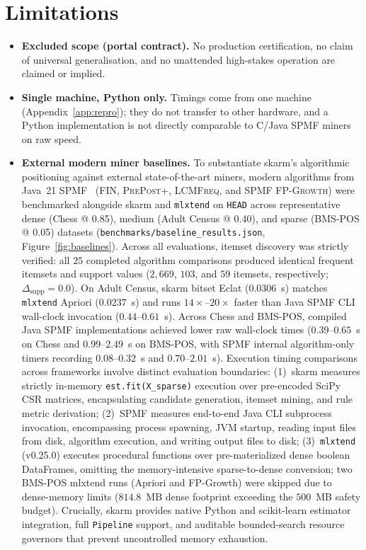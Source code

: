 \documentclass[twocolumn,10pt]{article}
\newcommand{\skarm}{\textsf{skarm}\xspace}
\begin{document}
\section{Limitations}
\label{sec:limitations}
\begin{itemize}
  \item \textbf{Excluded scope (portal contract).} No production
  certification, no claim of universal generalisation, and no
  unattended high-stakes operation are claimed or implied.
  \item \textbf{Single machine, Python only.} Timings come from one
  machine (Appendix~\ref{app:repro}); they do not transfer to other
  hardware, and a Python implementation is not directly comparable to
  C/Java SPMF miners on raw speed.
  \item \textbf{External modern miner baselines.} To substantiate \skarm's
  algorithmic positioning against external state-of-the-art miners, modern algorithms
  from Java~21 SPMF~\cite{fournier2022,kallay2025}
  (\textsc{FIN}, \textsc{PrePost+}, \textsc{LCMFreq}, and SPMF \textsc{FP-Growth})
  were benchmarked alongside \skarm and \texttt{mlxtend} on \texttt{HEAD} across representative
  dense (Chess @ 0.85), medium (Adult Census @ 0.40), and sparse (BMS-POS @ 0.05)
  datasets (\texttt{benchmarks/baseline\_results.json}, Figure~\ref{fig:baselines}).
  Across all evaluations, itemset discovery was strictly verified: all $25$ completed algorithm
  comparisons produced identical frequent itemsets and support values ($2{,}669$, $103$, and $59$ itemsets, respectively; $\Delta_{\mathrm{supp}} = 0.0$).
  On Adult Census, \skarm bitset Eclat ($0.0306$~s) matches \texttt{mlxtend} Apriori ($0.0237$~s) and runs $14\times$--$20\times$ faster than Java SPMF CLI wall-clock invocation ($0.44$--$0.61$~s).
  Across Chess and BMS-POS, compiled Java SPMF implementations achieved lower raw wall-clock times
  ($0.39$--$0.65$~s on Chess and $0.99$--$2.49$~s on BMS-POS,
  with SPMF internal algorithm-only timers recording $0.08$--$0.32$~s and $0.70$--$2.01$~s).
  Execution timing comparisons across frameworks involve distinct evaluation boundaries:
  (1)~\skarm measures strictly in-memory \texttt{est.fit(X\_sparse)} execution over pre-encoded SciPy CSR matrices,
  encapsulating candidate generation, itemset mining, and rule metric derivation;
  (2)~SPMF measures end-to-end Java CLI subprocess invocation, encompassing process spawning,
  JVM startup, reading input files from disk, algorithm execution, and writing output files to disk;
  (3)~\texttt{mlxtend} (v0.25.0) executes procedural functions over pre-materialized dense boolean DataFrames, omitting the
  memory-intensive sparse-to-dense conversion; two BMS-POS mlxtend runs (Apriori and FP-Growth) were skipped due to dense-memory limits ($814.8$~MB dense footprint exceeding the $500$~MB safety budget).
  Crucially, \skarm provides native Python and scikit-learn estimator integration, full \texttt{Pipeline} support,
  and auditable bounded-search resource governors that prevent uncontrolled memory exhaustion.


\end{itemize}
\end{document}
